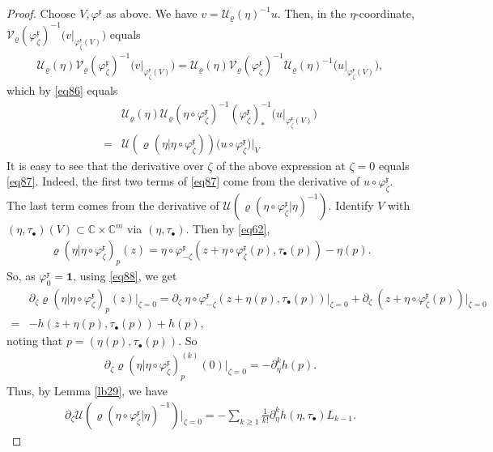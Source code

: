 \documentclass[12pt,a4paper,notitlepage]{report}
\theoremstyle{definition}
\theoremstyle{plain}
\newcommand{\fk}{\mathfrak}
\newcommand{\mc}{\mathcal}
\newcommand{\id}{\mathbf{1}}
\newcommand{\xk}{\mathfrak x}
\newcommand{\blt}{\bullet}
\newcommand{\Cbb}{\mathbb C}
\numberwithin{equation}{section}
\begin{document}
\begin{proof}
Choose $V,\varphi^{\fk x}$ as above. We have $v=\mc U_\varrho(\eta)^{-1}u$. Then, in the $\eta$-coordinate, $\mc V_\varrho(\varphi^{\fk x}_\zeta)^{-1}\big(v\big|_{\varphi^{\fk x}_\zeta(V)}\big)$ equals
\begin{align*}
\mc U_\varrho(\eta)\mc V_\varrho(\varphi^{\fk x}_\zeta)^{-1}\big(v\big|_{\varphi^{\fk x}_\zeta(V)}\big)=\mc U_\varrho(\eta)\mc V_\varrho(\varphi^{\fk x}_\zeta)^{-1}\mc U_\varrho(\eta)^{-1}\big(u\big|_{\varphi^{\fk x}_\zeta(V)}\big),
\end{align*}
which by \eqref{eq86}  equals
\begin{align*}
&\mc U_\varrho(\eta)\mc U_\varrho(\eta\circ\varphi^{\fk x}_\zeta)^{-1}(\varphi^{\fk x}_\zeta)_*^{-1}\big(u\big|_{\varphi^{\fk x}_\zeta(V)}\big)\\
=&\mc U(\varrho(\eta|\eta\circ\varphi^\xk_\zeta))\big(u\circ\varphi^{\fk x}_\zeta\big)\big|_V
\end{align*}
It is easy to see that the derivative over  $\zeta$ of the above expression at $\zeta=0$ equals \eqref{eq87}. Indeed, the first two terms of \eqref{eq87} come from the derivative of $u\circ\varphi^{\fk x}_\zeta$. The last term comes from the derivative of $\mc U(\varrho(\eta\circ\varphi_\zeta^{\fk x}|\eta)^{-1})$. Identify $V$ with $(\eta,\tau_\blt)(V)\subset\Cbb\times\Cbb^m$ via $(\eta,\tau_\blt)$. Then by \eqref{eq62},  
\begin{align*}
\varrho(\eta|\eta\circ\varphi^\xk_\zeta)_p(z)=\eta\circ\varphi_{-\zeta}^\xk(z+\eta\circ\varphi_\zeta^\xk(p),\tau_\blt(p))-\eta(p).
\end{align*}
So, as $\varphi^\xk_0=\id$, using \eqref{eq88}, we get
\begin{align*}
&\partial_\zeta\varrho(\eta|\eta\circ\varphi^\xk_\zeta)_p(z)\big|_{\zeta=0}=\partial_\zeta~\eta\circ\varphi_{-\zeta}^\xk(z+\eta(p),\tau_\blt(p))\big|_{\zeta=0}+\partial_\zeta~(z+\eta\circ\varphi_\zeta^\xk(p))\big|_{\zeta=0}\\
=&-h(z+\eta(p),\tau_\blt(p))+h(p),
\end{align*}
noting that $p=(\eta(p),\tau_\blt(p))$. So
\begin{align*}
\partial_\zeta\varrho(\eta|\eta\circ\varphi^\xk_\zeta)^{(k)}_p(0)\big|_{\zeta=0}=-\partial_\eta^k h(p).
\end{align*}
Thus, by Lemma \ref{lb29}, we have
\begin{align*}
\partial_\zeta\mc U(\varrho(\eta\circ\varphi_\zeta^{\fk x}|\eta)^{-1})\big|_{\zeta=0}=-\sum_{k\geq 1}\frac 1{k!}\partial_\eta^k h(\eta,\tau_\blt)L_{k-1}.
\end{align*}
\end{proof}
\end{document}

